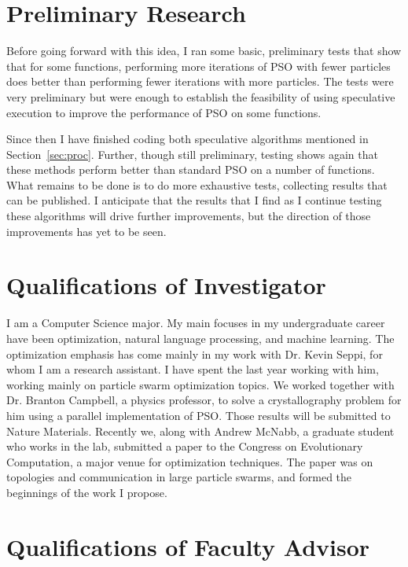 \documentclass[onecolumn, 12pt]{article}
\begin{document}
\section{Preliminary Research}

Before going forward with this idea, I ran some basic, preliminary tests that
show that for some functions, performing more iterations of PSO with fewer
particles does better than performing fewer iterations with more particles.
The tests were very preliminary but were enough to establish the feasibility of
using speculative execution to improve the performance of PSO on some
functions.  

Since then I have finished coding both speculative algorithms mentioned in
Section~\ref{sec:proc}.  Further, though still preliminary, testing shows again
that these methods perform better than standard PSO on a number of functions.
What remains to be done is to do more exhaustive tests, collecting results that
can be published.  I anticipate that the results that I find as I continue
testing these algorithms will drive further improvements, but the direction of
those improvements has yet to be seen.

\section{Qualifications of Investigator}

I am a Computer Science major.  My main focuses in my undergraduate career have
been optimization, natural language processing, and machine learning.  The
optimization emphasis has come mainly in my work with Dr. Kevin Seppi, for whom
I am a research assistant.  I have spent the last year working with him,
working mainly on particle swarm optimization topics.  We worked together with
Dr. Branton Campbell, a physics professor, to solve a crystallography problem
for him using a parallel implementation of PSO.  Those results will be
submitted to Nature Materials.  Recently we, along with Andrew McNabb, a
graduate student who works in the lab, submitted a paper to the Congress on
Evolutionary Computation, a major venue for optimization techniques.  The paper
was on topologies and communication in large particle swarms, and formed the
beginnings of the work I propose.

\section{Qualifications of Faculty Advisor}
\end{document}
